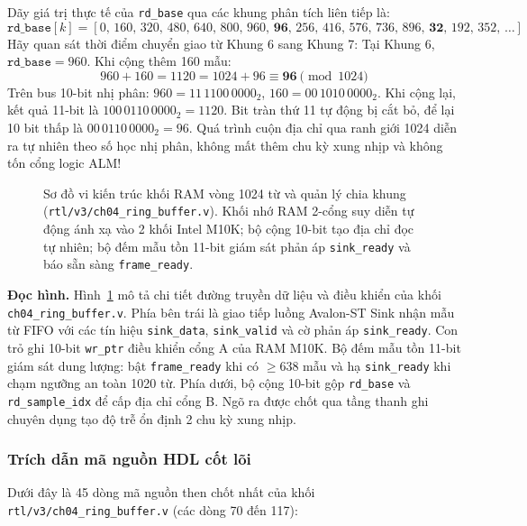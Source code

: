 Dãy giá trị thực tế của \texttt{rd\_base} qua các khung phân tích liên tiếp là:
\begin{equation}
\texttt{rd\_base}[k] = [0,\, 160,\, 320,\, 480,\, 640,\, 800,\, 960,\, \mathbf{96},\, 256,\, 416,\, 576,\, 736,\, 896,\, \mathbf{32},\, 192,\, 352,\, \dots]
\end{equation}
Hãy quan sát thời điểm chuyển giao từ Khung 6 sang Khung 7:
Tại Khung 6, $\texttt{rd\_base} = 960$. Khi cộng thêm 160 mẫu:
\begin{equation}
960 + 160 = 1120 = 1024 + 96 \equiv \mathbf{96} \pmod{1024}
\end{equation}
Trên bus 10-bit nhị phân: $960 = 11\,1100\,0000_2$, $160 = 00\,1010\,0000_2$. Khi cộng lại, kết quả 11-bit là $100\,0110\,0000_2 = 1120$. Bit tràn thứ 11 tự động bị cắt bỏ, để lại 10 bit thấp là $00\,0110\,0000_2 = 96$. Quá trình cuộn địa chỉ qua ranh giới 1024 diễn ra tự nhiên theo số học nhị phân, không mất thêm chu kỳ xung nhịp và không tốn cổng logic ALM!

\begin{figure}[t]
\centering
\resizebox{\textwidth}{!}{}
\caption{Sơ đồ vi kiến trúc khối RAM vòng 1024 từ và quản lý chia khung (\texttt{rtl/v3/ch04\_ring\_buffer.v}). Khối nhớ RAM 2-cổng suy diễn tự động ánh xạ vào 2 khối Intel M10K; bộ cộng 10-bit tạo địa chỉ đọc tự nhiên; bộ đếm mẫu tồn 11-bit giám sát phản áp \texttt{sink\_ready} và báo sẵn sàng \texttt{frame\_ready}.}
\label{fig:ch04_ring_buffer}
\end{figure}

\textbf{Đọc hình.} Hình~\ref{fig:ch04_ring_buffer} mô tả chi tiết đường truyền dữ liệu và điều khiển của khối \texttt{ch04\_ring\_buffer.v}. Phía bên trái là giao tiếp luồng Avalon-ST Sink nhận mẫu từ FIFO với các tín hiệu \texttt{sink\_data}, \texttt{sink\_valid} và cờ phản áp \texttt{sink\_ready}. Con trỏ ghi 10-bit \texttt{wr\_ptr} điều khiển cổng A của RAM M10K. Bộ đếm mẫu tồn 11-bit giám sát dung lượng: bật \texttt{frame\_ready} khi có $\ge 638$ mẫu và hạ \texttt{sink\_ready} khi chạm ngưỡng an toàn 1020 từ. Phía dưới, bộ cộng 10-bit gộp \texttt{rd\_base} và \texttt{rd\_sample\_idx} để cấp địa chỉ cổng B. Ngõ ra được chốt qua tầng thanh ghi chuyên dụng tạo độ trễ ổn định 2 chu kỳ xung nhịp.

\subsubsection*{Trích dẫn mã nguồn HDL cốt lõi}
Dưới đây là 45 dòng mã nguồn then chốt nhất của khối \texttt{rtl/v3/ch04\_ring\_buffer.v} (các dòng 70 đến 117):

